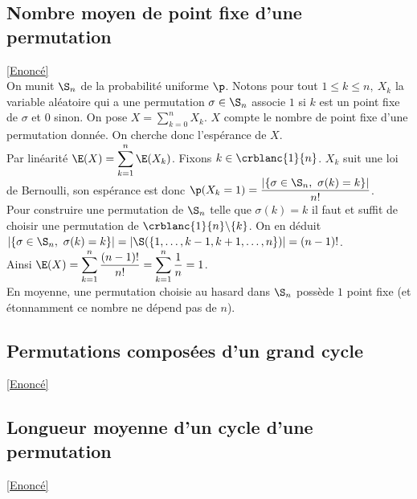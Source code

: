 \documentclass[8pt]{book}
\begin{document}
	\subsection{Nombre moyen de point fixe d'une permutation }
	\label{Nombre moyen de point fixe d'une permutation corrigé}
	\textcolor{blue}{\hyperref[Nombre moyen de point fixe d'une permutation]{[Enoncé]}}\\
	On munit $\S_n$ de la probabilité uniforme $\p$. Notons pour tout $1\leq k\leq n,\ X_k$ la variable aléatoire qui a une permutation $\sigma\in \S_n$ associe $1$ si $k$ est un point fixe de $\sigma$ et $0$ sinon. On pose $X=\displaystyle\sum_{k=0}^nX_k$. $X$ compte le nombre de point fixe d'une permutation donnée. On cherche donc l'espérance de $X$.\\
	Par linéarité $\E(X)=\displaystyle\sum_{k=1}^n\E(X_k)$. Fixons $k\in \crblanc{1}{n}$. $X_k$ suit une loi de Bernoulli, son espérance est donc $\p(X_k=1)=\dfrac{|\{\sigma\in \S_n,\ \sigma(k)=k\}|}{n!}$.\\
	Pour construire une permutation de $\S_n$ telle que $\sigma(k)=k$ il faut et suffit de choisir une permutation de $\crblanc{1}{n}\backslash\{k\}$. On en déduit $|\{\sigma\in \S_n,\ \sigma(k)=k\}|=|\S(\{1,\dots,k-1,k+1,\dots,n\})|=(n-1)!$.\\
	Ainsi $\E(X)=\displaystyle\sum_{k=1}^n\frac{(n-1)!}{n!}=\sum_{k=1}^n\frac{1}{n}=1$.\\
	En moyenne, une permutation choisie au hasard dans $\S_n$ possède $1$ point fixe (et étonnamment ce nombre ne dépend pas de $n$).
	
	\subsection{Permutations composées d'un grand cycle}
	\label{Permutations composées d'un grand cycle corrigé}
	\textcolor{blue}{\hyperref[Permutations composées d'un grand cycle]{[Enoncé]}}\\
	
	\subsection{Longueur moyenne d'un cycle d'une permutation}
	\label{Longueur moyenne d'un cycle d'une permutation corrigé}
	\textcolor{blue}{\hyperref[Longueur moyenne d'un cycle d'une permutation]{[Enoncé]}}\\
	
\end{document}
